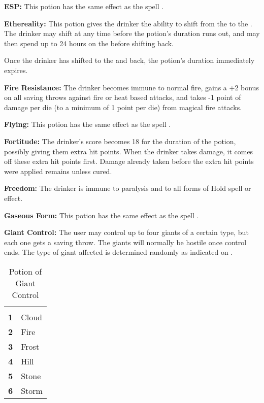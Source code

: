 \begin{multicols*}{2}
\textbf{ESP:} This potion has the same effect as the spell .

\textbf{Ethereality:} This potion gives the drinker the ability to shift from the  to the . The drinker may shift at any time before the potion’s duration runs out, and may then spend up to 24 hours on the  before shifting back.

Once the drinker has shifted to the  and back, the potion’s duration immediately expires.

\textbf{Fire Resistance:} The drinker becomes immune to normal fire, gains a +2 bonus on all saving throws against fire or heat based attacks, and takes -1 point of damage per die (to a minimum of 1 point per die) from magical fire attacks.

\textbf{Flying:} This potion has the same effect as the spell .

\textbf{Fortitude:} The drinker’s  score becomes 18 for the duration of the potion, possibly giving them extra hit points. When the drinker takes damage, it comes off these extra hit points first. Damage already taken before the extra hit points were applied remains unless cured.

\textbf{Freedom:} The drinker is immune to paralysis and to all forms of Hold spell or effect.

\textbf{Gaseous Form:} This potion has the same effect as the spell .

\textbf{Giant Control:} The user may control up to four giants of a certain type, but each one gets a saving throw. The giants will normally be hostile once control ends. The type of giant affected is determined randomly as indicated on .

\begin {table}[H]
  \caption{Potion of Giant Control}\label{tab:Potion of Giant Control}
  \begin{tabularx}{\columnwidth}{>{\bfseries}YY}
	 & \\
	1 & Cloud\\
	2 & Fire\\
	3 & Frost\\
	4 & Hill\\
	5 & Stone\\
	6 & Storm
  \end {tabularx}
\end {table}


\end{multicols*}

